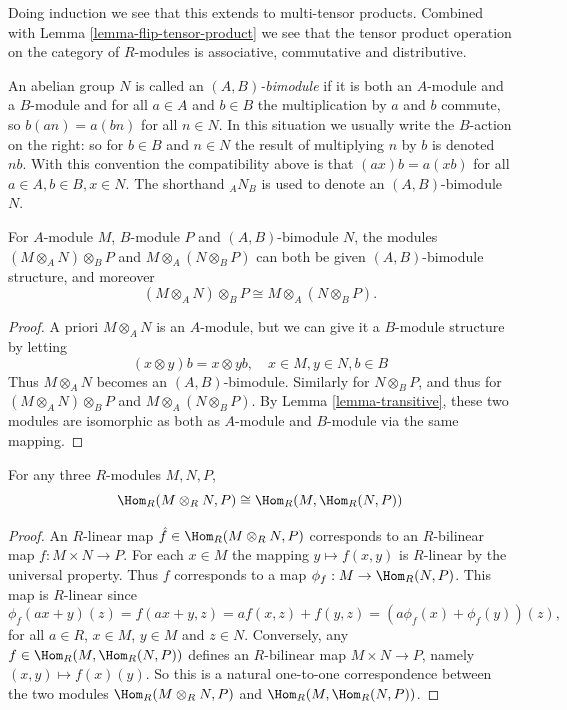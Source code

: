 \noindent
Doing induction we see that this extends to multi-tensor products. Combined
with Lemma \ref{lemma-flip-tensor-product} we see that
the tensor product operation on the category of $R$-modules is associative,
commutative and distributive.

\begin{definition}
\label{definition-bimodule}
An abelian group $N$ is called an {\it $(A, B)$-bimodule} if it is both an
$A$-module and a $B$-module and for all $a \in A$ and $b \in B$ the
multiplication by $a$ and $b$ commute, so $b(an) = a(bn)$ for all $n \in N$.
In this situation we usually write the $B$-action on the right: so
for $b \in B$ and $n \in N$ the result of multiplying $n$ by $b$
is denoted $nb$. With this convention the compatibility above is
that $(ax)b = a(xb)$ for all $a\in A, b\in B, x\in N$.
The shorthand $_AN_B$ is used to denote an $(A, B)$-bimodule $N$.
\end{definition}

\begin{lemma}
\label{lemma-tensor-with-bimodule}
For $A$-module $M$, $B$-module $P$ and $(A, B)$-bimodule $N$, the modules
$(M \otimes_A N)\otimes_B P$ and $M \otimes_A(N \otimes_B P)$ can both be
given $(A, B)$-bimodule structure,
and moreover
$$
(M \otimes_A N)\otimes_B P \cong M \otimes_A(N \otimes_B P).
$$
\end{lemma}

\begin{proof}
A priori $M \otimes_A N$ is an $A$-module, but we can give it a
$B$-module structure by letting
$$
(x \otimes y)b = x \otimes yb, \quad x\in M, y\in N, b\in B
$$
Thus $M \otimes_A N$ becomes an $(A, B)$-bimodule. Similarly for
$N \otimes_B P$, and thus for
$(M \otimes_A N)\otimes_B P$ and $M \otimes_A(N \otimes_B P)$. By
Lemma \ref{lemma-transitive}, these two
modules are isomorphic as both as $A$-module and $B$-module via the same
mapping.
\end{proof}

\begin{lemma}
\label{lemma-hom-from-tensor-product}
For any three $R$-modules $M, N, P$,
$$
\Hom_R(M \otimes_R N, P) \cong \Hom_R(M, \Hom_R(N, P))
$$
\end{lemma}

\begin{proof}
An $R$-linear map $\hat{f}\in \Hom_R(M \otimes_R N, P)$ corresponds to an
$R$-bilinear map $f : M \times N \to P$. For
each $x\in M$ the mapping $y\mapsto f(x, y)$ is $R$-linear by the universal
property. Thus $f$ corresponds to a
map $\phi_f : M \to \Hom_R(N, P)$. This map is $R$-linear since
$$
\phi_f(ax + y)(z) =
f(ax + y, z) = af(x, z)+f(y, z) =
(a\phi_f(x)+\phi_f(y))(z),
$$
for all $a \in R$, $x \in M$, $y \in M$ and
$z \in N$. Conversely, any
$f \in \Hom_R(M, \Hom_R(N, P))$ defines an $R$-bilinear
map $M \times N \to P$, namely $(x, y)\mapsto f(x)(y)$.
So this is a natural one-to-one correspondence between the
two modules
$\Hom_R(M \otimes_R N, P)$ and $\Hom_R(M, \Hom_R(N, P))$.
\end{proof}

